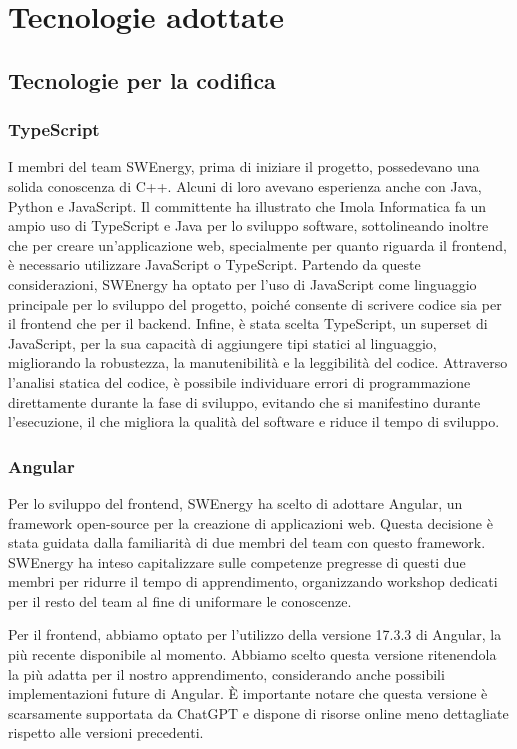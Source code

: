 \section{Tecnologie adottate}

\subsection{Tecnologie per la codifica}

\subsubsection{TypeScript}

I membri del team SWEnergy, prima di iniziare il progetto, possedevano una
solida conoscenza di C++. Alcuni di loro avevano esperienza anche con Java,
Python e JavaScript. Il committente ha illustrato che Imola Informatica fa un
ampio uso di TypeScript e Java per lo sviluppo software, sottolineando inoltre
che per creare un'applicazione web, specialmente per quanto riguarda il
frontend, è necessario utilizzare JavaScript o TypeScript. Partendo da queste
considerazioni, SWEnergy ha optato per l'uso di JavaScript come linguaggio
principale per lo sviluppo del progetto, poiché consente di scrivere codice sia
per il frontend che per il backend. Infine, è stata scelta TypeScript, un
superset di JavaScript, per la sua capacità di aggiungere tipi statici al
linguaggio, migliorando la robustezza, la manutenibilità e la leggibilità del
codice. Attraverso l'analisi statica del codice, è possibile individuare errori
di programmazione direttamente durante la fase di sviluppo, evitando che si
manifestino durante l'esecuzione, il che migliora la qualità del software e
riduce il tempo di sviluppo.

\subsubsection{Angular}

Per lo sviluppo del frontend, SWEnergy ha scelto di adottare Angular, un
framework open-source per la creazione di applicazioni web. Questa decisione è
stata guidata dalla familiarità di due membri del team con questo framework.
SWEnergy ha inteso capitalizzare sulle competenze pregresse di questi due membri
per ridurre il tempo di apprendimento, organizzando workshop dedicati per il
resto del team al fine di uniformare le conoscenze.

Per il frontend, abbiamo optato per l'utilizzo della versione 17.3.3 di Angular,
la più recente disponibile al momento. Abbiamo scelto questa versione
ritenendola la più adatta per il nostro apprendimento, considerando anche
possibili implementazioni future di Angular. È importante notare che questa
versione è scarsamente supportata da ChatGPT e dispone di risorse online meno
dettagliate rispetto alle versioni precedenti.

